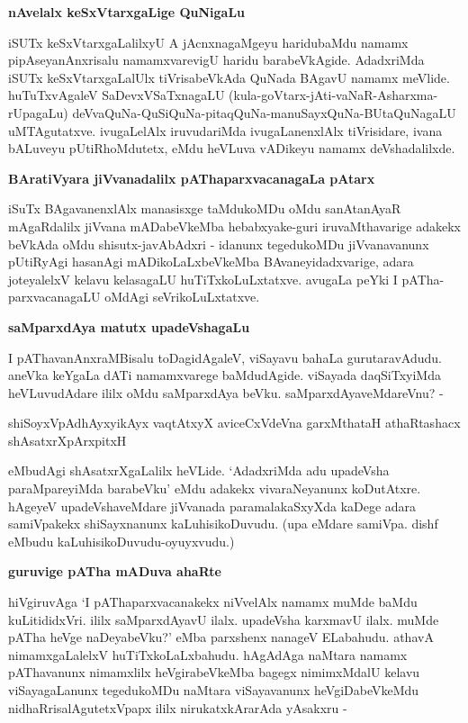 {\bigskip
\noindent
{\large\bf nAvelalx keSxVtarxgaLige QuNigaLu}}\label{page104b}
\medskip

\noindent
iSUTx keSxVtarxgaLalilxyU A jAcnxnagaMgeyu haridubaMdu namamx pipAseyanAnxrisalu namamxvarevigU haridu barabeVkAgide. AdadxriMda iSUTx keSxVtarxgaLalUlx tiVrisabeVkAda QuNada BAgavU namamx meVlide. huTuTxvAgaleV SaDevxVSaTxnagaLU (kula-goVtarx-jAti-vaNaR-Asharxma-rUpagaLu) deVvaQuNa-QuSiQuNa-pitaqQuNa-manuSayxQuNa-BUtaQuNagaLU uMTAgutatxve. ivugaLelAlx iruvudariMda ivugaLanenxlAlx tiVrisidare, ivana bALuveyu pUtiRhoMdutetx, eMdu heVLuva vADikeyu \hbox{namamx} deVshadalilxde.

{\bigskip
\noindent
{\large\bf BAratiVyara jiVvanadalilx pAThaparxvacanagaLa pAtarx}}\label{page105}
\medskip

\noindent
iSuTx BAgavanenxlAlx manasisxge taMdukoMDu oMdu sanAtanAyaR mAgaRdalilx jiVvana mADabeVkeMba hebabxyake-guri iruvaMthavarige adakekx beVkAda oMdu shisutx-javAbAdxri - idanunx tegedukoMDu jiVvanavanunx pUtiRyAgi hasanAgi mADikoLaLxbeVkeMba BAvaneyidadxvarige, adara joteyalelxV kelavu kelasagaLU huTiTxkoLuLxtatxve. avugaLa peYki I pATha-parxvacanagaLU oMdAgi seVrikoLuLxtatxve.

{\bigskip
\noindent
{\large\bf saMparxdAya matutx upadeVshagaLu}}\label{page105a}
\medskip

\noindent
I pAThavanAnxraMBisalu toDagidAgaleV, viSayavu bahaLa gurutaravAdudu. aneVka keYgaLa dATi namamxvarege baMdudAgide. viSayada daqSiTxyiMda heVLuvudAdare ililx oMdu saMparxdAya beVku. saMparxdAyaveMdareVnu? -

\begin{shloka}
shiSoyxVpAdhAyxyikAyx vaqtAtxyX aviceCxVdeVna garxMthataH athaRtashacx shAsatxrXpArxpitxH\label{105}
\end{shloka}

\noindent
eMbudAgi shAsatxrXgaLalilx heVLide. `AdadxriMda adu upadeVsha paraMpareyiMda barabeVku' eMdu adakekx vivaraNeyanunx koDutAtxre. hAgeyeV upadeVshaveMdare jiVvanada paramalakaSxyXda kaDege adara samiVpakekx shiSayxnanunx kaLuhisikoDuvudu. (upa eMdare samiVpa. dishf eMbudu kaLuhisikoDuvudu-oyuyxvudu.)

{\bigskip
\noindent
{\large\bf guruvige pATha mADuva ahaRte}}\label{page105b}
\medskip

\noindent
hiVgiruvAga `I pAThaparxvacanakekx niVvelAlx namamx muMde baMdu kuLitididxVri. ililx saMparxdAyavU ilalx. upadeVsha karxmavU ilalx. muMde pATha heVge naDeyabeVku?' eMba parxshenx nanageV ELabahudu. athavA nimamxgaLalelxV huTiTxkoLaLxbahudu. hAgAdAga naMtara namamx pAThavanunx nimamxlilx heVgirabeVkeMba bagegx nimimxMdalU kelavu viSayagaLanunx tegedukoMDu naMtara viSayavanunx heVgiDabeVkeMdu nidhaRrisalAgutetxVpapx ililx nirukatxkArarAda yAsakxru -

